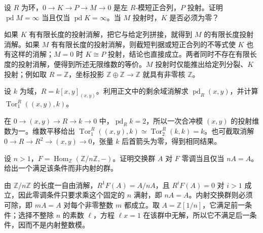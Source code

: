 \begin{exercise}\label{b4:ex:10-syzygy-step}
	设 \(R\) 为环，\(0\to K\to P\to M\to0\) 是左 \(R\)-模短正合列，\(P\) 投射。证明 \(\operatorname{pd}M=\infty\) 当且仅当 \(\operatorname{pd}K=\infty\)。当 \(M\) 投射时，\(K\) 是否必须为零？
\end{exercise}
\begin{solution}
	如果 \(K\) 有有限长度的投射消解，把它与给定列拼接，就得到 \(M\) 的有限长度投射消解。如果 \(M\) 有有限长度的投射消解，则截短判据或短正合列的不等式使 \(K\) 也有这样的消解；\(M=0\) 时 \(K\cong P\) 投射，结论也直接成立。两者同时不存在有限长度的投射消解，便得到所述无限维数的等价。\(M\) 投射时仅能推出给定列分裂、\(K\) 投射；例如取 \(R=\mathbb Z\)，坐标投影 \(\mathbb Z\oplus\mathbb Z\to\mathbb Z\) 就具有非零核 \(\mathbb Z\)。
\end{solution}

\begin{exercise}\label{b4:ex:10-local-top-tor}
	设 \(k\) 为域，\(R=k[x,y]_{(x,y)}\)。利用正文中的剩余域消解求 \(\operatorname{pd}_R(x,y)\)，并计算 \(\operatorname{Tor}_1^R((x,y),k)\)。
\end{exercise}
\begin{solution}
	在 \(0\to(x,y)\to R\to k\to0\) 中，\(\operatorname{pd}_Rk=2\)，所以一次合冲模 \((x,y)\) 的投射维数为一。维数平移给出 \(\operatorname{Tor}_1^R((x,y),k)\simeq\operatorname{Tor}_2^R(k,k)=k\)。也可截取消解 \(0\to R\to R^2\to(x,y)\to0\)，张量 \(k\) 后首箭头为零，得到相同结果。
\end{solution}

\begin{exercise}\label{b4:ex:10-acyclic-n-divisible}
	设 \(n>1\)，\(F=\operatorname{Hom}_{\mathbb Z}(\mathbb Z/n\mathbb Z,-)\)。证明交换群 \(A\) 对 \(F\) 零调当且仅当 \(nA=A\)。给出一个满足该条件而非内射的群。
\end{exercise}
\begin{solution}
	由 \(\mathbb Z/n\mathbb Z\) 的长度一自由消解，\(R^1F(A)=A/nA\)，且 \(R^iF(A)=0\) 对 \(i>1\) 成立，因此零调条件只要求乘这个固定的 \(n\) 满射，即 \(nA=A\)。内射交换群则必须可除，即 \(mA=A\) 对每个非零整数 \(m\) 都成立。取 \(A=\mathbb Z[1/n]\)，它满足前一条件；选择不整除 \(n\) 的素数 \(\ell\)，方程 \(\ell x=1\) 在该群中无解，所以它不满足后一条件，因而不是内射整数模。
\end{solution}

